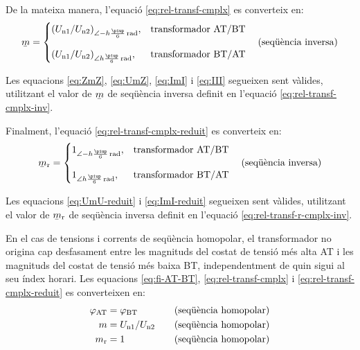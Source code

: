 De la mateixa manera, l'equació \eqref{eq:rel-transf-cmplx} es converteix en:
\begin{equation}\label{eq:rel-transf-cmplx-inv}
\cmplx{m} = \begin{cases}
     (U\ped{n1}/U\ped{n2})_{\angle -h \frac{\piup}{6}\si{\,rad}}, & \text{transformador AT/BT}\\[2.7ex]
     (U\ped{n1}/U\ped{n2})_{\angle h \frac{\piup}{6}\si{\,rad}}, & \text{transformador BT/AT}
\end{cases}
\text{\quad(seqüència inversa)}
\end{equation}

Les equacions \eqref{eq:ZmZ}, \eqref{eq:UmZ}, \eqref{eq:ImI} i \eqref{eq:III} segueixen sent vàlides, utilitzant el valor de $\cmplx{m}$ de seqüència inversa definit en l'equació \eqref{eq:rel-transf-cmplx-inv}.

Finalment, l'equació \eqref{eq:rel-transf-cmplx-reduit} es converteix en:
\begin{equation}\label{eq:rel-transf-r-cmplx-inv}
\cmplx{m}\ped{r}  = \begin{cases}
      1_{\angle -h\frac{\piup}{6}\si{\,rad}}, & \text{transformador AT/BT}\\[2.7ex]
      1_{\angle h\frac{\piup}{6}\si{\,rad}}, & \text{transformador BT/AT}
\end{cases}
\text{\quad(seqüència inversa)}
\end{equation}

Les equacions \eqref{eq:UmU-reduit} i \eqref{eq:ImI-reduit} segueixen sent vàlides, utilitzant el valor de $\cmplx{m}\ped{r}$ de seqüència inversa definit en l'equació \eqref{eq:rel-transf-r-cmplx-inv}.

En el cas de tensions i corrents de seqüència homopolar, el transformador no  origina cap desfasament entre les magnituds  del costat de tensió més alta AT i les magnituds del costat de tensió més baixa BT, independentment de quin sigui al seu índex horari. Les equacions \eqref{eq:fi-AT-BT}, \eqref{eq:rel-transf-cmplx} i \eqref{eq:rel-transf-cmplx-reduit} es converteixen en:
\begin{alignat}{3}
  \varphi_\mathrm{AT} &= \varphi_\mathrm{BT} &&\quad\text{(seqüència homopolar)} \\
  m &= U_\mathrm{n1}/U_\mathrm{n2} &&\quad\text{(seqüència homopolar)}\label{eq:rel-transf-cmplx-hom} \\
  m_\mathrm{r} &= 1 &&\quad\text{(seqüència homopolar)}
\end{alignat}

